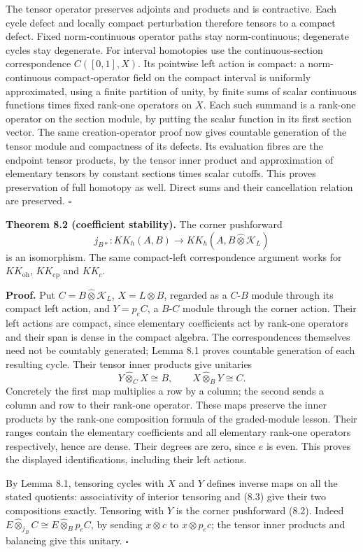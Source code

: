\documentclass[
  11pt,
]{article}
\begin{document}
The tensor operator preserves adjoints and products and is contractive.
Each cycle defect and locally compact perturbation therefore tensors to
a compact defect. Fixed norm-continuous operator paths stay
norm-continuous; degenerate cycles stay degenerate. For interval
homotopies use the continuous-section correspondence \(C([0,1],X)\). Its
pointwise left action is compact: a norm-continuous compact-operator
field on the compact interval is uniformly approximated, using a finite
partition of unity, by finite sums of scalar continuous functions times
fixed rank-one operators on \(X\). Each such summand is a rank-one
operator on the section module, by putting the scalar function in its
first section vector. The same creation-operator proof now gives
countable generation of the tensor module and compactness of its
defects. Its evaluation fibres are the endpoint tensor products, by the
tensor inner product and approximation of elementary tensors by constant
sections times scalar cutoffs. This proves preservation of full homotopy
as well. Direct sums and their cancellation relation are preserved.
\(\square\)

\textbf{Theorem 8.2 (coefficient stability).} The corner pushforward \[
j_{B*}:KK_h(A,B)\longrightarrow
KK_h(A,B\widehat\otimes\mathcal K_L)
\tag{8.2}
\] is an isomorphism. The same compact-left correspondence argument
works for \(KK_{\mathrm{oh}}\), \(KK_{\mathrm{cp}}\) and \(KK_c\).

\textbf{Proof.} Put \(C=B\widehat\otimes\mathcal K_L\),
\(X=L\widehat\otimes B\), regarded as a \(C\)-\(B\) module through its
compact left action, and \(Y=p_eC\), a \(B\)-\(C\) module through the
corner action. Their left actions are compact, since elementary
coefficients act by rank-one operators and their span is dense in the
compact algebra. The correspondences themselves need not be countably
generated; Lemma 8.1 proves countable generation of each resulting
cycle. Their tensor inner products give unitaries \[
Y\widehat\otimes_C X\cong B,\qquad
X\widehat\otimes_B Y\cong C.
\tag{8.3}
\] Concretely the first map multiplies a row by a column; the second
sends a column and row to their rank-one operator. These maps preserve
the inner products by the rank-one composition formula of the
graded-module lesson. Their ranges contain the elementary coefficients
and all elementary rank-one operators respectively, hence are dense.
Their degrees are zero, since \(e\) is even. This proves the displayed
identifications, including their left actions.

By Lemma 8.1, tensoring cycles with \(X\) and \(Y\) defines inverse maps
on all the stated quotients: associativity of interior tensoring and
(8.3) give their two compositions exactly. Tensoring with \(Y\) is the
corner pushforward (8.2). Indeed
\(E\widehat\otimes_{j_B}C\cong E\widehat\otimes_B p_eC\), by sending
\(x\otimes c\) to \(x\otimes p_ec\); the tensor inner products and
balancing give this unitary. \(\square\)
\end{document}
